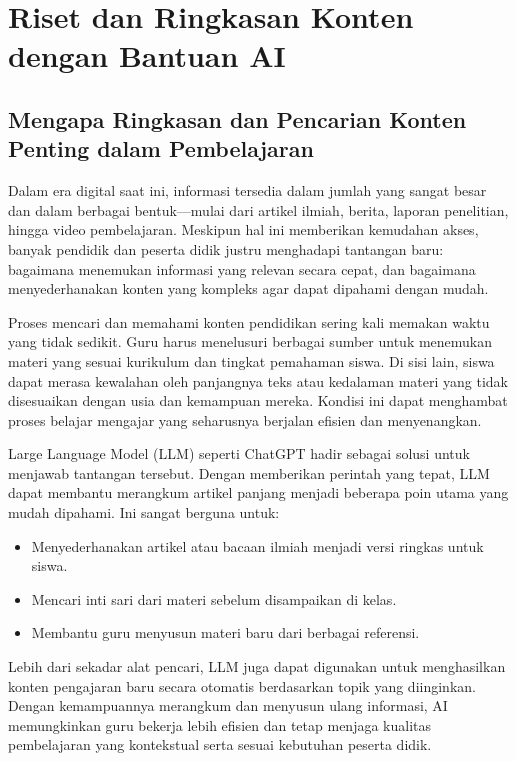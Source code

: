 \chapter{Riset dan Ringkasan Konten dengan Bantuan AI}

\section{Mengapa Ringkasan dan Pencarian Konten Penting dalam Pembelajaran}

Dalam era digital saat ini, informasi tersedia dalam jumlah yang sangat besar dan dalam berbagai bentuk—mulai dari artikel ilmiah, berita, laporan penelitian, hingga video pembelajaran. Meskipun hal ini memberikan kemudahan akses, banyak pendidik dan peserta didik justru menghadapi tantangan baru: bagaimana menemukan informasi yang relevan secara cepat, dan bagaimana menyederhanakan konten yang kompleks agar dapat dipahami dengan mudah.

Proses mencari dan memahami konten pendidikan sering kali memakan waktu yang tidak sedikit. Guru harus menelusuri berbagai sumber untuk menemukan materi yang sesuai kurikulum dan tingkat pemahaman siswa. Di sisi lain, siswa dapat merasa kewalahan oleh panjangnya teks atau kedalaman materi yang tidak disesuaikan dengan usia dan kemampuan mereka. Kondisi ini dapat menghambat proses belajar mengajar yang seharusnya berjalan efisien dan menyenangkan.

Large Language Model (LLM) seperti ChatGPT hadir sebagai solusi untuk menjawab tantangan tersebut. Dengan memberikan perintah yang tepat, LLM dapat membantu merangkum artikel panjang menjadi beberapa poin utama yang mudah dipahami. Ini sangat berguna untuk:
\begin{itemize}
	\item Menyederhanakan artikel atau bacaan ilmiah menjadi versi ringkas untuk siswa.
	\item Mencari inti sari dari materi sebelum disampaikan di kelas.
	\item Membantu guru menyusun materi baru dari berbagai referensi.
\end{itemize}

Lebih dari sekadar alat pencari, LLM juga dapat digunakan untuk menghasilkan konten pengajaran baru secara otomatis berdasarkan topik yang diinginkan. Dengan kemampuannya merangkum dan menyusun ulang informasi, AI memungkinkan guru bekerja lebih efisien dan tetap menjaga kualitas pembelajaran yang kontekstual serta sesuai kebutuhan peserta didik.

